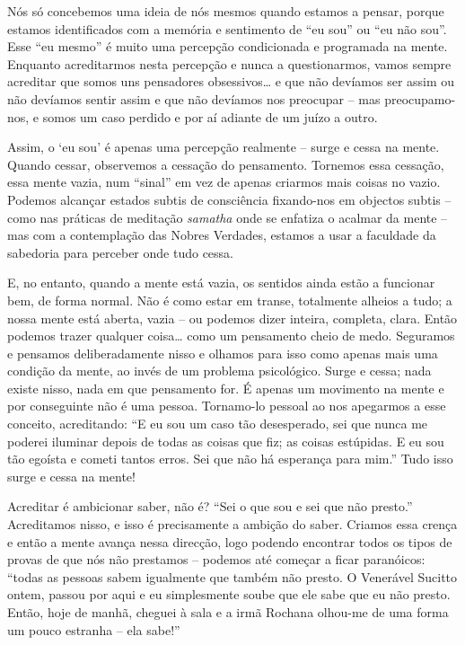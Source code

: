 Nós só concebemos uma ideia de nós mesmos quando estamos a pensar, porque
estamos identificados com a memória e sentimento de ``eu sou'' ou ``eu não
sou''. Esse ``eu mesmo'' é muito uma percepção condicionada e programada na
mente. Enquanto acreditarmos nesta percepção e nunca a questionarmos, vamos
sempre acreditar que somos uns pensadores obsessivos\ldots{} e que não devíamos
ser assim ou não devíamos sentir assim e que não devíamos nos preocupar -- mas
preocupamo-nos, e somos um caso perdido e por aí adiante de um juízo a outro.

Assim, o `eu sou' é apenas uma percepção realmente -- surge e cessa na mente.
Quando cessar, observemos a cessação do pensamento. Tornemos essa cessação, essa
mente vazia, num ``sinal'' em vez de apenas criarmos mais coisas no vazio.
Podemos alcançar estados subtis de consciência fixando-nos em objectos subtis --
como nas práticas de meditação \emph{samatha} onde se enfatiza o acalmar da
mente -- mas com a contemplação das Nobres Verdades, estamos a usar a faculdade
da sabedoria para perceber onde tudo cessa.

E, no entanto, quando a mente está vazia, os sentidos ainda estão a funcionar
bem, de forma normal. Não é como estar em transe, totalmente alheios a tudo; a
nossa mente está aberta, vazia -- ou podemos dizer inteira, completa, clara.
Então podemos trazer qualquer coisa\ldots{} como um pensamento cheio de medo.
Seguramos e pensamos deliberadamente nisso e olhamos para isso como apenas mais
uma condição da mente, ao invés de um problema psicológico. Surge e cessa; nada
existe nisso, nada em que pensamento for. É apenas um movimento na mente e por
conseguinte não é uma pessoa. Tornamo-lo pessoal ao nos apegarmos a esse
conceito, acreditando: ``E eu sou um caso tão desesperado, sei que nunca me
poderei iluminar depois de todas as coisas que fiz; as coisas estúpidas. E eu
sou tão egoísta e cometi tantos erros. Sei que não há esperança para mim.'' Tudo
isso surge e cessa na mente!

Acreditar é ambicionar saber, não é? ``Sei o que sou e sei que não presto.''
Acreditamos nisso, e isso é precisamente a ambição do saber. Criamos essa crença
e então a mente avança nessa direcção, logo podendo encontrar todos os tipos de
provas de que nós não prestamos -- podemos até começar a ficar paranóicos:
``todas as pessoas sabem igualmente que também não presto. O Venerável Sucitto
ontem, passou por aqui e eu simplesmente soube que ele sabe que eu não presto.
Então, hoje de manhã, cheguei à sala e a irmã Rochana olhou-me de uma forma um
pouco estranha -- ela sabe!''

